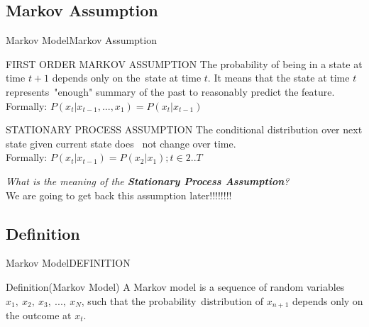 \documentclass[10pt]{beamer}
\begin{document}
\subsection{Markov Assumption}
\begin{frame}{Markov Model}{Markov Assumption}
  \begin{block}{FIRST ORDER MARKOV ASSUMPTION}
        The probability of being in a state at time $t+1$ depends only on the\
        state at time $t$. It means that the state at time $t$ represents\
        "enough" summary of the past to reasonably predict the feature.\cite{Daniel}\\
        Formally:
             $P(x_t|x_{t-1},...,x_1) = P(x_t|x_{t-1})$
  \end{block}
  \begin{block}{STATIONARY PROCESS ASSUMPTION}
       The conditional distribution over next state given current state does \
       not change over time. \cite{Daniel}\\ 
       Formally:
       $P(x_t|x_{t-1}) = P(x_2|x_1);t \in 2..T$
  \end{block}
  \textit{What is the meaning of the \textbf{Stationary Process Assumption}?}\\
  We are going to get back this assumption later!!!!!!!!
\end{frame}

\subsection{Definition}
\begin{frame}{Markov Model}{DEFINITION}
  \begin{block}{Definition(Markov Model)}
     A Markov model is a sequence of random variables \ 
     $x_1,\ x_2,\ x_3,\ ...,\ x_N$, such that the probability\
     distribution of $x_{n+1}$ depends only on the outcome at $x_t$.
  \end{block}
\end{frame}

\end{document}
